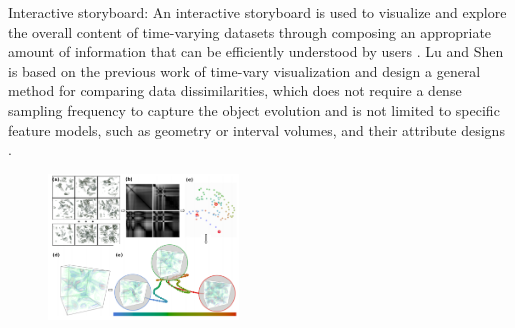 \documentclass{egpubl}
\begin{document}
Interactive storyboard: An interactive storyboard is used to visualize and explore the overall content of time-varying datasets through composing an appropriate amount of information that can be efficiently understood by users \cite{lu2008interactive}. 
Lu and Shen is based on the previous work of time-vary visualization \cite{hansen2011visualization} and design a general method for comparing data dissimilarities, which does not require a dense sampling frequency to capture the object evolution and is not limited to specific feature models, such as geometry or interval volumes, and their attribute designs \cite{lu2008interactive}. 

\begin{figure}
\includegraphics[width=0.45\textwidth]{./images/lu2008}
\label{lu2008}
\end{figure}
\end{document}
